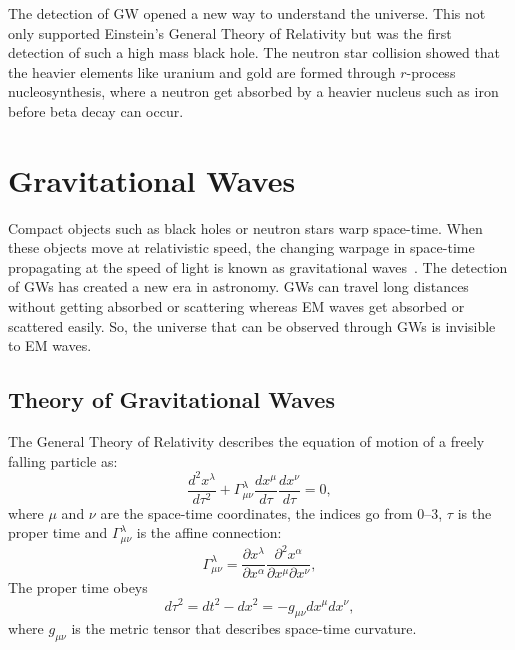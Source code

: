 \documentclass{ttuthes2007}
\begin{document}
The detection of \ac{GW} opened a new way to understand the universe. This not
only supported Einstein's General Theory of Relativity but was the first
detection of such a high mass black hole. The neutron star collision showed that the
heavier elements like uranium and gold are formed through $r$-process
nucleosynthesis, where a neutron get absorbed by a heavier nucleus such as
iron before beta decay can occur.



\chapter{\textbf{Gravitational Waves}}
Compact objects such as black holes or neutron stars warp space-time. When
these objects move at relativistic speed, the changing warpage in space-time
propagating at the speed of light is known as gravitational
waves~\cite{thorne1995gravitational}. The detection of \acp{GW} has created a
new era in astronomy.  \acp{GW} can travel long distances without getting
absorbed or scattering whereas \ac{EM} waves get absorbed or scattered easily. So, the
universe that can be observed through \acp{GW} is invisible to \ac{EM} waves. 

\section{Theory of Gravitational Waves}
The General Theory of Relativity describes the equation of motion of a freely
falling particle as:
\begin{equation}
\frac{d^2x^\lambda}{d\tau^2}+\Gamma^\lambda_{\mu\nu}\frac{dx^\mu}{d\tau}\frac{dx^\nu}{d\tau}=0,
\end{equation}
where $\mu$ and $\nu$ are the space-time coordinates, the indices go from 0--3,
$\tau$ is the proper time and  $\Gamma^\lambda_{\mu\nu}$ is the affine connection:
\begin{equation}
\Gamma^\lambda_{\mu\nu} =\frac{\partial x^\lambda}{\partial
x^\alpha}\frac{\partial^2x^\alpha}{\partial x^\mu \partial x^\nu},
\end{equation}
The proper time obeys
\begin{equation}
d\tau^2=dt^2 - dx^2 = -g_{\mu\nu}dx^\mu dx^\nu,
\end{equation}
where $g_{\mu\nu}$ is the metric tensor that describes space-time curvature.
\end{document}
